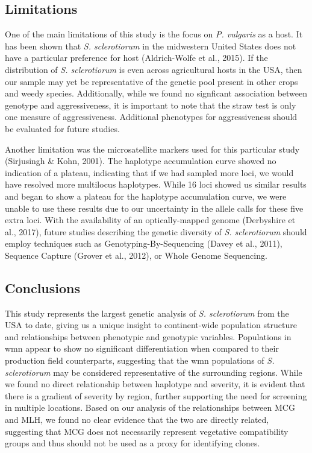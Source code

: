 \documentclass[fleqn,10pt,lineno]{wlpeerj} %
\theoremstyle{definition}
\theoremstyle{definition}
\theoremstyle{definition}
\theoremstyle{remark}
\begin{document}
\subsection*{Limitations}\label{limitations}

One of the main limitations of this study is the focus on \emph{P.
vulgaris} as a host. It has been shown that \emph{S. sclerotiorum} in
the midwestern United States does not have a particular preference for
host (Aldrich-Wolfe et al., 2015). If the distribution of \emph{S.
sclerotiorum} is even across agricultural hosts in the USA, then our
sample may yet be representative of the genetic pool present in other
crops and weedy species. Additionally, while we found no signficant
association between genotype and aggressiveness, it is important to note
that the straw test is only one measure of aggressiveness. Additional
phenotypes for aggressiveness should be evaluated for future studies.

Another limitation was the microsatellite markers used for this
particular study (Sirjusingh \& Kohn, 2001). The haplotype accumulation
curve showed no indication of a plateau, indicating that if we had
sampled more loci, we would have resolved more multilocus haplotypes.
While 16 loci showed us similar results and began to show a plateau for
the haplotype accumulation curve, we were unable to use these results
due to our uncertainty in the allele calls for these five extra loci.
With the availability of an optically-mapped genome (Derbyshire et al.,
2017), future studies describing the genetic diversity of \emph{S.
sclerotiorum} should employ techniques such as Genotyping-By-Sequencing
(Davey et al., 2011), Sequence Capture (Grover et al., 2012), or Whole
Genome Sequencing.

\subsection*{Conclusions}\label{conclusions}

This study represents the largest genetic analysis of \emph{S.
sclerotiorum} from the USA to date, giving us a unique insight to
continent-wide population structure and relationships between phenotypic
and genotypic variables. Populations in wmn appear to show no
significant differentiation when compared to their production field
counterparts, suggesting that the wmn populations of \emph{S.
sclerotiorum} may be considered representative of the surrounding
regions. While we found no direct relationship between haplotype and
severity, it is evident that there is a gradient of severity by region,
further supporting the need for screening in multiple locations. Based
on our analysis of the relationships between MCG and MLH, we found no
clear evidence that the two are directly related, suggesting that MCG
does not necessarily represent vegetative compatibility groups and thus
should not be used as a proxy for identifying clones.
\end{document}
